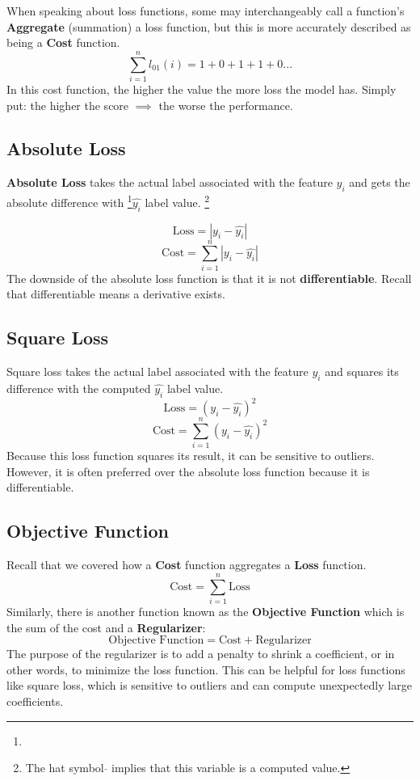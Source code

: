 When speaking about loss functions, some may interchangeably call a function's \textbf{Aggregate} (summation) a loss function, but this is more accurately described as being a \textbf{Cost} function.
\[ 
\sum_{i=1}^{n} l_{01}(i) = 1 + 0 + 1 + 1 + 0 . . . 
\]
In this cost function, the higher the value the more loss the model has. Simply put: the higher the score $\implies$ the worse the performance. 

\subsection{Absolute Loss}
\textbf{Absolute Loss} takes the actual label associated with the feature $y_i$ and gets the absolute difference with \footnote{}$\hat{y_i}$ label value.
\footnote[1]{The hat symbol $\hat{}$ implies that this variable is a computed value.}

\[ 
\text{Loss}=|y_i - \hat{y_i}|
\]
\[ 
\text{Cost}=\sum_{i=1}^{n} |y_i - \hat{y_i}|
\]
The downside of the absolute loss function is that it is not \textbf{differentiable}. Recall that differentiable means a derivative exists.

\subsection{Square Loss}
Square loss takes the actual label associated with the feature $y_i$ and squares its difference with the computed $\hat{y_i}$ label value.
\[ 
\text{Loss}=(y_i - \hat{y_i})^2
\]
\[ 
\text{Cost}=\sum_{i=1}^{n} (y_i - \hat{y_i})^2
\]
Because this loss function squares its result, it can be sensitive to outliers. However, it is often preferred over the absolute loss function because it is differentiable.

\subsection{Objective Function}
Recall that we covered how a \textbf{Cost} function aggregates a \textbf{Loss} function.
\[ 
\text{Cost}=\sum_{i=1}^{n} \text{Loss}
\]
Similarly, there is another function known as the \textbf{Objective Function} which is the sum of the cost and a \textbf{Regularizer}:
\[ 
\text{Objective Function}=\text{Cost} + \text{Regularizer}
\]
The purpose of the regularizer is to add a penalty to shrink a coefficient, or in other words, to minimize the loss function. This can be helpful for loss functions like square loss, which is sensitive to outliers and can compute unexpectedly large coefficients.


